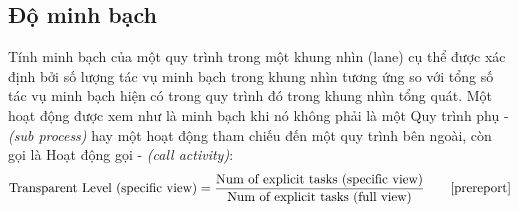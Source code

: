 \subsection{Độ minh bạch}
Tính minh bạch của một quy trình trong một khung nhìn (lane) cụ thể được xác định bởi số lượng tác vụ minh bạch trong khung nhìn tương ứng so với tổng số tác vụ minh bạch hiện có trong quy trình đó trong khung nhìn tổng quát. Một hoạt động được xem như là minh bạch khi nó không phải là một Quy trình phụ - \emph{(sub process)} hay một hoạt động tham chiếu đến một quy trình bên ngoài, còn gọi là Hoạt động gọi - \emph{(call activity)}:
\[ \text{Transparent Level (specific view)}  = \frac{\text{Num of explicit tasks (specific view)} }{\text{Num of explicit tasks (full view)}} \tag*{\cite{prereport}}\]
